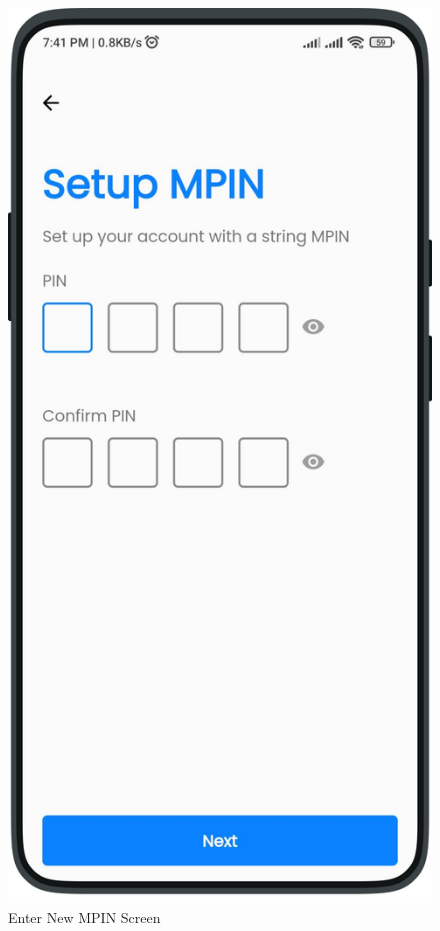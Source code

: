 \begin{multicols}{2}
\begin{figure}[H]
            \includegraphics[width=0.6\linewidth]{images/results/mobile/SetupMPIN.png}
            \caption[Enter New MPIN Screen]{Enter New MPIN Screen}
            \label{fig:SetupMPIN.png}
            \end{figure}
        \end{multicols}

